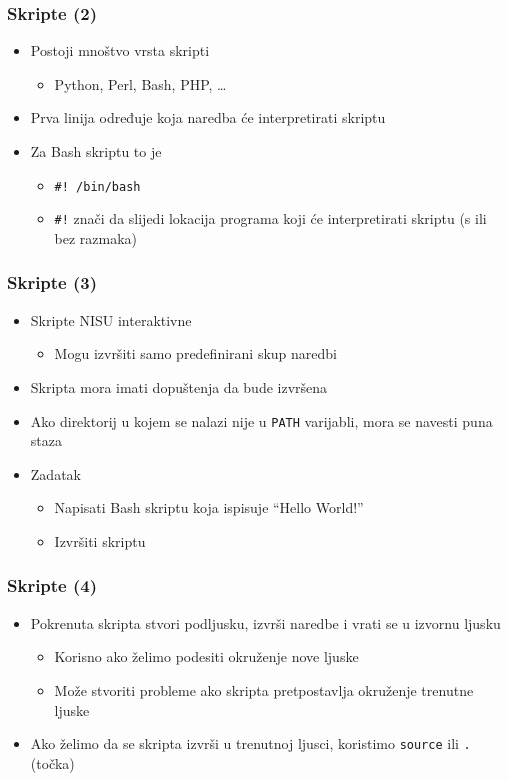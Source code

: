 \documentclass[table,usenames,dvipsnames]{beamer}
\newcommand{\shell}[1]{\texttt{#1}}
\begin{document}
\begin{frame}[t]
\frametitle{Skripte (2)}
\begin{itemize}
  \item Postoji mnoštvo vrsta skripti
  \begin{itemize}
    \item Python, Perl, Bash, PHP, \ldots
  \end{itemize}
  \item Prva linija određuje koja naredba će interpretirati skriptu
  \item Za Bash skriptu to je
  \begin{itemize}
    \item[] \shell{\#! /bin/bash}
    \item \shell{\#!} znači da slijedi lokacija programa koji će 
          interpretirati skriptu (s ili bez razmaka)
  \end{itemize}
\end{itemize}
\end{frame}

\begin{frame}[t]
\frametitle{Skripte (3)}
\begin{itemize}
  \item Skripte NISU interaktivne
  \begin{itemize}
    \item Mogu izvršiti samo predefinirani skup naredbi
  \end{itemize}
  \item Skripta mora imati dopuštenja da bude izvršena
  \item Ako direktorij u kojem se nalazi nije u \shell{PATH} varijabli, 
        mora se navesti puna staza
  \item Zadatak
  \begin{itemize}
    \item Napisati Bash skriptu koja ispisuje ``Hello World!''
    \item Izvršiti skriptu
  \end{itemize}
\end{itemize}
\end{frame}

\begin{frame}[t]
\frametitle{Skripte (4)}
\begin{itemize}
  \item Pokrenuta skripta stvori podljusku, izvrši naredbe i vrati se u 
        izvornu ljusku
  \begin{itemize}
    \item Korisno ako želimo podesiti okruženje nove ljuske
    \item Može stvoriti probleme ako skripta pretpostavlja okruženje 
          trenutne ljuske
  \end{itemize}
  \item Ako želimo da se skripta izvrši u trenutnoj ljusci, koristimo 
        \shell{source} ili \shell{.} (točka)
\end{itemize}
\end{frame}
\end{document}
